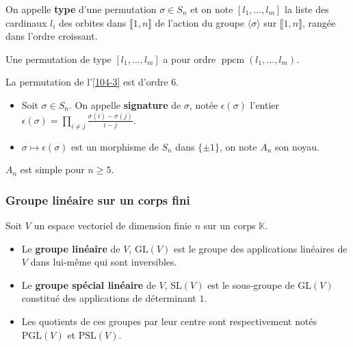 	\begin{definition}
		On appelle \textbf{type} d'une permutation $\sigma \in S_n$ et on note $[l_1, \dots, l_m]$ la liste des cardinaux $l_i$ des orbites dans $\llbracket 1, n \rrbracket$ de l'action du groupe $\langle \sigma \rangle$ sur $\llbracket 1, n \rrbracket$, rangée dans l'ordre croissant.
	\end{definition}
	
	\begin{proposition}
		Une permutation de type $[l_1, \dots, l_m]$ a pour ordre $\operatorname{ppcm}(l_1, \dots, l_m)$.
	\end{proposition}
	
	\begin{example}
		La permutation de l'\cref{104-3} est d'ordre $6$.
	\end{example}
	
	\begin{definition}
		\begin{itemize}
			\item Soit $\sigma \in S_n$. On appelle \textbf{signature} de $\sigma$, notée $\epsilon(\sigma)$ l'entier $\epsilon(\sigma) = \prod_{i \neq j} \frac{\sigma(i) - \sigma(j)}{i-j}$.
			\item $\sigma \mapsto \epsilon(\sigma)$ est un morphisme de $S_n$ dans $\{ \pm 1 \}$, on note $A_n$ son noyau.
		\end{itemize}
	\end{definition}
	
	
	\begin{theorem}
		$A_n$ est simple pour $n \geq 5$.
	\end{theorem}
	
	\subsubsection{Groupe linéaire sur un corps fini}
	
	
	Soit $V$ un espace vectoriel de dimension finie $n$ sur un corps $\mathbb{K}$.
	
	\begin{definition}
		\begin{itemize}
			\item Le \textbf{groupe linéaire} de $V$, $\mathrm{GL}(V)$ est le groupe des applications linéaires de $V$ dans lui-même qui sont inversibles.
			\item Le \textbf{groupe spécial linéaire} de $V$, $\mathrm{SL}(V)$ est le sous-groupe de $\mathrm{GL}(V)$ constitué des applications de déterminant $1$.
			\item Les quotients de ces groupes par leur centre sont respectivement notés $\mathrm{PGL}(V)$ et $\mathrm{PSL}(V)$.
		\end{itemize}
	\end{definition}
	
